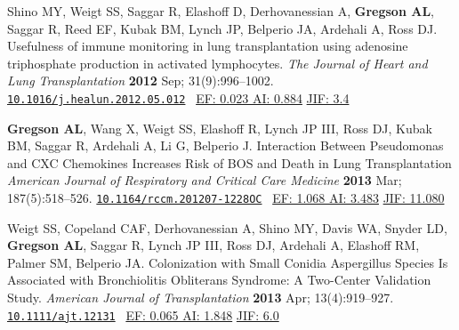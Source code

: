 \documentclass[12pt]{moderncv} %
\begin{document}
\begin{thebibliography}{1}
  \bibitem[20]{} Shino MY, Weigt SS, Saggar R, Elashoff D, Derhovanessian A, \textbf{Gregson AL}, Saggar R, Reed EF, Kubak BM, Lynch JP, Belperio JA, Ardehali A, Ross DJ. Usefulness of immune monitoring in lung transplantation using adenosine triphosphate production in activated lymphocytes. {\color{journalcolor}\textit{The Journal of Heart and Lung Transplantation}} \textbf{2012} Sep; 31(9):996--1002. \href{http://dx.doi.org/10.1016/j.healun.2012.05.012}{\nolinkurl{10.1016/j.healun.2012.05.012}}~
    {\color{subsectioncolor} \href{http://www.eigenfactor.org/rankings.php?search=JOURNAL+OF+HEART+AND+LUNG+TRANSPLANTATION&search2=&search3=&searchby=journal}{{\smaller EF: 0.023 AI: 0.884}}
       \href{http://admin-apps.webofknowledge.com/JCR/JCR?RQ=RECORD&rank=1&journal=J+HEART+LUNG+TRANSPL}{{\smaller JIF: 3.4}}
    }


  \bibitem[21]{} \textbf{Gregson AL}, Wang X, Weigt SS, Elashoff R, Lynch JP III, Ross DJ, Kubak BM, Saggar R, Ardehali A, Li G, Belperio J. Interaction Between Pseudomonas and CXC Chemokines Increases Risk of {\smaller BOS} and Death in Lung Transplantation {\color{journalcolor}\textit{American Journal of Respiratory and Critical Care Medicine}} \textbf{2013} Mar; 187(5):518--526. \href{http://dx.doi.org/10.1164/rccm.201207-1228OC}{\nolinkurl{10.1164/rccm.201207-1228OC}}~
    {\color{subsectioncolor}\href{http://www.eigenfactor.org/rankings.php?bsearch=AMERICAN+JOURNAL+OF+RESPIRATORY+AND+CRITICAL+CARE+MEDICINE&searchby=journal&orderby=eigenfactor}{{\smaller EF: 1.068 AI: 3.483}}
      \href{http://admin-apps.webofknowledge.com/JCR/JCR?RQ=RECORD&rank=1&journal=AM+J+RESP+CRIT+CARE}{{\smaller JIF: 11.080}}
    }


  \bibitem[22]{} Weigt SS, Copeland CAF, Derhovanessian A, Shino MY, Davis WA, Snyder LD, \textbf{Gregson AL}, Saggar R, Lynch JP III, Ross DJ, Ardehali A, Elashoff RM, Palmer SM, Belperio JA. Colonization with Small Conidia Aspergillus Species Is Associated with Bronchiolitis Obliterans Syndrome: A Two-Center Validation Study. {\color{journalcolor}\textit{American Journal of Transplantation}} \textbf{2013} Apr; 13(4):919--927. \href{http://dx.doi.org/10.1111/ajt.12131}{\nolinkurl{10.1111/ajt.12131}}~
       {\color{subsectioncolor}\href{http://www.eigenfactor.org/detail.php?year=2006&jrlname=AM%20J%20TRANSPLANT&issnnum=1600-6135}{{\smaller EF: 0.065 AI: 1.848}} 
       \href{http://admin-apps.webofknowledge.com/JCR/JCR?RQ=RECORD&rank=1&journal=AM+J+TRANSPLANT}{{\smaller JIF: 6.0}}~
       }



\end{thebibliography}
\end{document}

